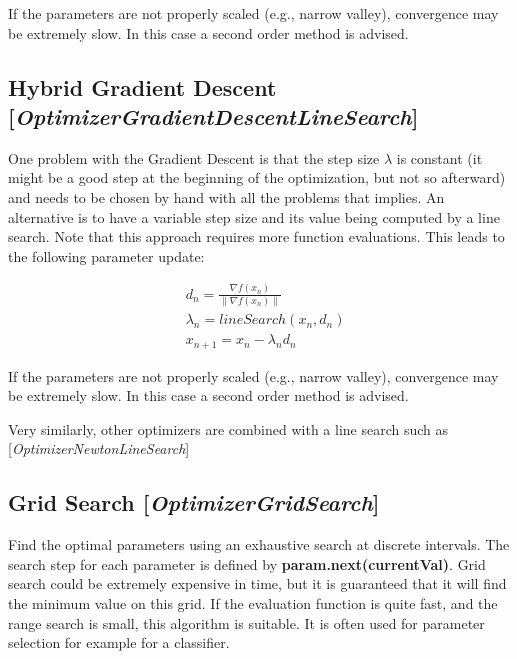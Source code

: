 \documentclass[11pt]{article}
\newcommand{\nllref}[1]{[\small{\textit{#1}}]}
\begin{document}
If the parameters are not properly scaled (e.g., narrow valley), convergence may be extremely slow. In this case a second order method is advised.

\subsection{Hybrid Gradient Descent \nllref{OptimizerGradientDescentLineSearch}}
One problem with the Gradient Descent is that the step size $\lambda$ is constant (it might be a good step at the beginning of the optimization, but not so afterward) and needs to be chosen by hand with all the problems that implies. An alternative is to have a variable step size and its value being computed by a line search. Note that this approach requires more function evaluations. This leads to the following parameter update:

\begin{align}
& d_n = \frac{\nabla{f}(x_n)}{\lVert \nabla{f}(x_n) \lVert} \nonumber\\
& \lambda_n = lineSearch(x_n, d_n) \nonumber\\
& x_{n+1} = x_n - \lambda _n d_n
\end{align}

If the parameters are not properly scaled (e.g., narrow valley), convergence may be extremely slow. In this case a second order method is advised.

Very similarly, other optimizers are combined with a line search such as
\nllref{OptimizerNewtonLineSearch}

\subsection{Grid Search \nllref{OptimizerGridSearch}}
Find the optimal parameters using an exhaustive search at discrete intervals. The search step for each parameter is defined
by \textbf{param.next(currentVal)}. Grid search could be extremely expensive in time, but it is guaranteed that it will find the minimum
value on this grid. If the evaluation function is quite fast, and the range search is small, this algorithm is suitable. It is often used for parameter selection for example for a classifier.
\end{document}
